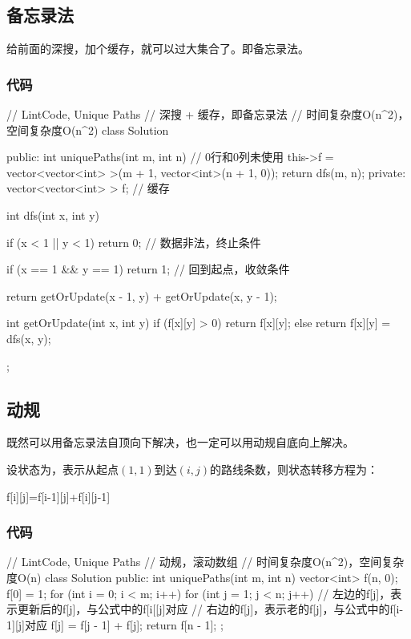\subsection{备忘录法}
给前面的深搜，加个缓存，就可以过大集合了。即备忘录法。

\subsubsection{代码}
\begin{Code}
// LintCode, Unique Paths
// 深搜 + 缓存，即备忘录法
// 时间复杂度O(n^2)，空间复杂度O(n^2)
class Solution {
public:
    int uniquePaths(int m, int n) {
        // 0行和0列未使用
        this->f = vector<vector<int> >(m + 1, vector<int>(n + 1, 0));
        return dfs(m, n);
    }
private:
    vector<vector<int> > f;  // 缓存

    int dfs(int x, int y) {
        if (x < 1 || y < 1) return 0; // 数据非法，终止条件

        if (x == 1 && y == 1) return 1; // 回到起点，收敛条件

        return getOrUpdate(x - 1, y) + getOrUpdate(x, y - 1);
    }

    int getOrUpdate(int x, int y) {
        if (f[x][y] > 0) return f[x][y];
        else return f[x][y] = dfs(x, y);
    }
};
\end{Code}


\subsection{动规}
既然可以用备忘录法自顶向下解决，也一定可以用动规自底向上解决。

设状态为，表示从起点$(1,1)$到达$(i,j)$的路线条数，则状态转移方程为：
\begin{Code}
f[i][j]=f[i-1][j]+f[i][j-1]
\end{Code}


\subsubsection{代码}
\begin{Code}
// LintCode, Unique Paths
// 动规，滚动数组
// 时间复杂度O(n^2)，空间复杂度O(n)
class Solution {
public:
    int uniquePaths(int m, int n) {
        vector<int> f(n, 0);
        f[0] = 1;
        for (int i = 0; i < m; i++) {
            for (int j = 1; j < n; j++) {
                // 左边的f[j]，表示更新后的f[j]，与公式中的f[i[[j]对应
                // 右边的f[j]，表示老的f[j]，与公式中的f[i-1][j]对应
                f[j] = f[j - 1] + f[j];
            }
        }
        return f[n - 1];
    }
};
\end{Code}


